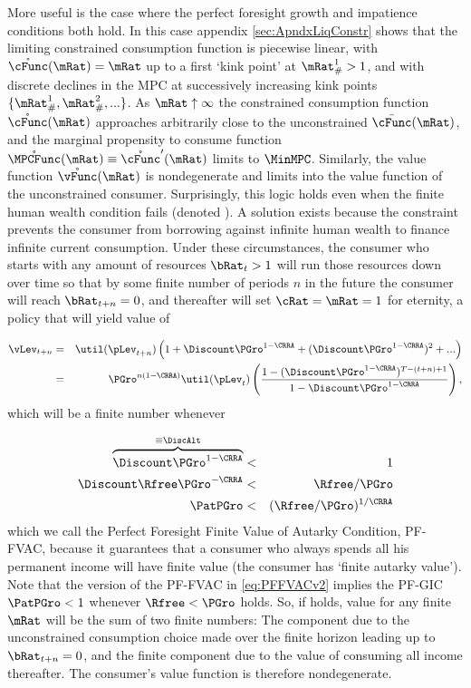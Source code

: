\documentclass[titlepage]{\econtex}\providecommand{\texname}{BufferStockTheory}%
\begin{document}
More useful is the case where the perfect foresight growth and impatience conditions both hold.  In this case appendix \ref{sec:ApndxLiqConstr} shows that the limiting constrained consumption function is piecewise linear, with $\mathring{\cFunc}(\mRat)=\mRat$ up to a first `kink point' at $\mRat_{\#}^{1}>1$, and with discrete declines in the MPC at successively increasing kink points $\{\mRat_{\#}^{1},\mRat_{\#}^{2},...\}$.  As $\mRat \uparrow \infty$ the constrained consumption function $\mathring{\cFunc}(\mRat)$ approaches arbitrarily close to the unconstrained $\bar{\cFunc}(\mRat)$, and the marginal propensity to consume function $\mathring{\MPCFunc}(\mRat) \equiv \mathring{\cFunc}^{\prime}(\mRat)$ limits to $\MinMPC$.  Similarly, the value function $\mathring{\vFunc}(\mRat)$ is nondegenerate and limits into the value function of the unconstrained consumer.  Surprisingly, this logic holds even when the finite human wealth condition fails (denoted ).  A solution exists because the constraint prevents the consumer from borrowing against infinite human wealth to finance infinite current consumption.  Under these circumstances, the consumer who starts with any amount of resources $\bRat_{t} > 1$ will run those resources down over time so that by some finite number of periods $n$ in the future the consumer will reach $\bRat_{t+n} = 0$, and thereafter will set $\cRat = \mRat = 1$ for eternity, a policy that will yield value of

\begin{eqnarray}
  \vLev_{t+n} & = & \util(\pLev_{t+n})\left(1+\Discount
    \PGro^{1-\CRRA}+(\Discount \PGro^{1-\CRRA})^{2}+...\right) \notag
  \\ & = & \PGro^{n(1-\CRRA)} \util(\pLev_{t})\left(\frac{1-(\Discount
      \PGro^{1-\CRRA})^{T-(t+n)+1}}{1-\Discount \PGro^{1-\CRRA}}\right),
  \notag
\end{eqnarray}
which will be a finite number whenever

\begin{eqnarray}
   \overbrace{\Discount \PGro^{1-\CRRA} }^{\equiv \DiscAlt} & < & 1 \label{eq:PFFVAC}
\\ \Discount \Rfree \PGro^{-\CRRA} & < & \Rfree/\PGro \nonumber
\\ \PatPGro & < & (\Rfree/\PGro)^{1/\CRRA} \label{eq:PFFVACv2}
\end{eqnarray}
which we call the Perfect Foresight Finite Value of Autarky Condition, PF-FVAC, because it guarantees that a consumer who always spends all his permanent income will have finite value (the consumer has `finite autarky value').  Note that the version of the PF-FVAC in \eqref{eq:PFFVACv2} implies the PF-GIC $\PatPGro < 1$ whenever  $\Rfree < \PGro$ holds.  So, if  holds, value for any finite $\mRat$ will be the sum of two finite numbers: The component due to the unconstrained consumption choice made over the finite horizon leading up to $\bRat_{t+n} = 0$, and the finite component due to the value of consuming all income thereafter.  The consumer's value function is therefore nondegenerate.
\end{document}
